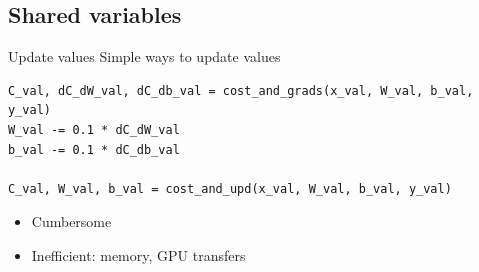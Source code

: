\documentclass[a4paper,9pt]{beamer}
\begin{document}
\subsection{Shared variables}
\begin{frame}[fragile]{Update values}
  Simple ways to update values
  \begin{verbatim}
C_val, dC_dW_val, dC_db_val = cost_and_grads(x_val, W_val, b_val, y_val)
W_val -= 0.1 * dC_dW_val
b_val -= 0.1 * dC_db_val

C_val, W_val, b_val = cost_and_upd(x_val, W_val, b_val, y_val)
  \end{verbatim}
  \begin{itemize}
    \item Cumbersome
    \item Inefficient: memory, GPU transfers
  \end{itemize}
\end{frame}

\end{document}
